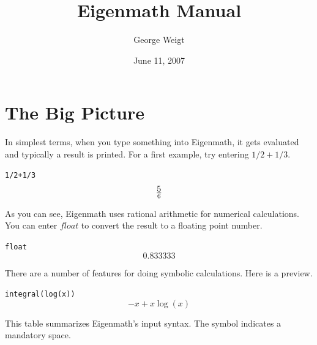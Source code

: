 \documentclass[12pt]{book}
\title{Eigenmath Manual}
\author{George Weigt}
\date{June 11, 2007}
\begin{document}
\maketitle
\tableofcontents

\newpage

\chapter{The Big Picture}
In simplest terms, when you type something into Eigenmath,
it gets evaluated and typically a result is printed.
For a first example, try entering $1/2+1/3$.

\medskip
\verb$1/2+1/3$
$$5\over6$$

\medskip
\noindent
As you can see, Eigenmath uses rational arithmetic for numerical calculations.
You can enter $float$ to convert the result to a floating point number.

\medskip
\verb$float$
$$0.833333$$

\medskip
\noindent
There are a number of features for doing symbolic calculations.
Here is a preview.

\medskip
\verb$integral(log(x))$
$$-x+x\log(x)$$

\newpage

\noindent
This table summarizes Eigenmath's input syntax.
The symbol {\tt{}} indicates a mandatory space.
\end{document}
